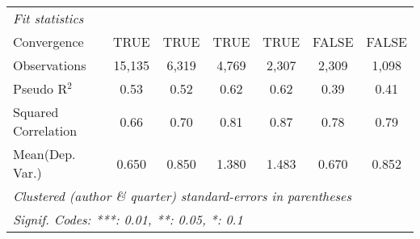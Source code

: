 \begin{tabular}{lcccccc}
   \midrule
   \emph{Fit statistics}\\
   Convergence                                                &TRUE           & TRUE          & TRUE         & TRUE    & FALSE          & FALSE\\  
   Observations                                               & 15,135        & 6,319         & 4,769        & 2,307   & 2,309          & 1,098\\  
   Pseudo R$^2$                                               & 0.53          & 0.52          & 0.62         & 0.62    & 0.39           & 0.41\\  
   Squared Correlation                                        & 0.66          & 0.70          & 0.81         & 0.87    & 0.78           & 0.79\\  
Mean(Dep. Var.) & 0.650 & 0.850 & 1.380 & 1.483 & 0.670 & 0.852 \\
   \midrule \midrule
   \multicolumn{7}{l}{\emph{Clustered (author \& quarter) standard-errors in parentheses}}\\
   \multicolumn{7}{l}{\emph{Signif. Codes: ***: 0.01, **: 0.05, *: 0.1}}\\
\end{tabular}
\par\endgroup
